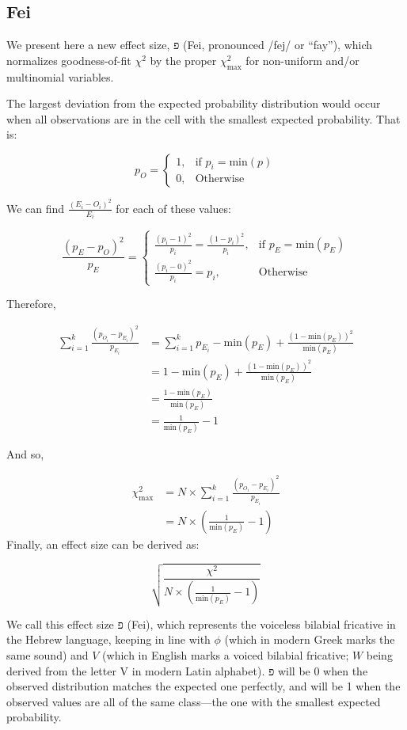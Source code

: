 \documentclass[
]{article}
\begin{document}
\hypertarget{fei}{%
\subsection{Fei}\label{fei}}

We present here a new effect size, פ (Fei, pronounced /fej/ or ``fay''),
which normalizes goodness-of-fit \(\chi^2\) by the proper
\(\chi^2_\text{max}\) for non-uniform and/or multinomial variables.

The largest deviation from the expected probability distribution would
occur when all observations are in the cell with the smallest expected
probability. That is:

\[
p_{O} = 
\begin{cases}
1, & \text{if } p_i = \text{min}(p) \\
0, & \text{Otherwise}
\end{cases}
\]

We can find \(\frac{(E_i-O_i)^2}{E_i}\) for each of these values:

\[
\frac{(p_{E}-p_{O})^2}{p_{E}} = 
\begin{cases}
\frac{(p_i-1)^2}{p_i} = \frac{(1-p_i)^2}{p_i}, & \text{if } p_{E} = \text{min}(p_{E}) \\
\frac{(p_i-0)^2}{p_i} = p_i, & \text{Otherwise}
\end{cases}
\]

Therefore,

\[
\begin{split}
\sum_{i=1}^{k}{\frac{(p_{O_i}-p_{E_i})^2}{p_{E_i}}} & = \sum_{i=1}^{k}{p_{E_i}} - \text{min}(p_{E}) + \frac{(1-\text{min}(p_{E}))^2}{\text{min}(p_{E})} \\
& = 1 - \text{min}(p_E) + \frac{(1-\text{min}(p_E))^2}{\text{min}(p_E)} \\
& = \frac{1-\text{min}(p_E)}{\text{min}(p_E)} \\
& = \frac{1}{\text{min}(p_E)} - 1
\end{split}
\]

And so,

\[
\begin{split}
\chi^2_\text{max} & = N \times \sum_{i=1}^{k}{\frac{(p_{O_i}-p_{E_i})^2}{p_{E_i}}} \\
 & = N \times (\frac{1}{\text{min}(p_E)} - 1)
\end{split}
\] Finally, an effect size can be derived as:

\[
\sqrt{\frac{\chi^2}{N \times (\frac{1}{\text{min}(p_E)} - 1)}}
\]

We call this effect size פ (Fei), which represents the voiceless
bilabial fricative in the Hebrew language, keeping in line with \(\phi\)
(which in modern Greek marks the same sound) and \(V\) (which in English
marks a voiced bilabial fricative; \(W\) being derived from the letter V
in modern Latin alphabet). פ will be 0 when the observed distribution
matches the expected one perfectly, and will be 1 when the observed
values are all of the same class---the one with the smallest expected
probability.
\end{document}
